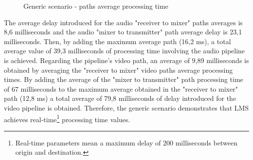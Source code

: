 \begin{figure}[!htb]
  \begin{center}
    \begin{subfigmatrix}{2}
    \end{subfigmatrix}
    \caption{Generic scenario - paths average processing time}
    \label{F:gsavgpt}
  \end{center}
\end{figure}

The average delay introduced for the audio "receiver to mixer" paths averages is 8,6 milliseconds and the audio "mixer to transmitter" path average delay is 23,1 milliseconds. Then, by adding the maximum average path (16,2 ms), a total average value of 39,3 milliseconds of processing time involving the audio pipeline is achieved. Regarding the pipeline's video path, an average of 9,89 milliseconds is obtained by averaging the "receiver to mixer" video paths average processing times. By adding the average of the "mixer to transmitter" path processing time of 67 milliseconds to the maximum average obtained in the "receiver to mixer" path (12,8 ms) a total average of 79,8 milliseconds of delay introduced for the video pipeline is obtained. Therefore, the generic scenario demonstrates that LMS achieves real-time\footnote{Real-time parameters mean a maximum delay of 200 milliseconds between origin and destination.} processing time values.

